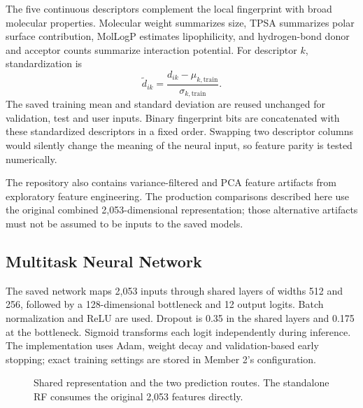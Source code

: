 \documentclass[11pt,a4paper]{article}\usepackage[margin=25mm]{geometry}\usepackage{fancyhdr}\usepackage{setspace}\usepackage{titlesec}\usepackage{xcolor}
\begin{document}
The five continuous descriptors complement the local fingerprint with broad molecular properties. Molecular weight summarizes size, TPSA summarizes polar surface contribution, MolLogP estimates lipophilicity, and hydrogen-bond donor and acceptor counts summarize interaction potential. For descriptor $k$, standardization is
\begin{equation}
\widetilde d_{ik}=\frac{d_{ik}-\mu_{k,\mathrm{train}}}{\sigma_{k,\mathrm{train}}}.
\end{equation}
The saved training mean and standard deviation are reused unchanged for validation, test and user inputs. Binary fingerprint bits are concatenated with these standardized descriptors in a fixed order. Swapping two descriptor columns would silently change the meaning of the neural input, so feature parity is tested numerically.

The repository also contains variance-filtered and PCA feature artifacts from exploratory feature engineering. The production comparisons described here use the original combined 2,053-dimensional representation; those alternative artifacts must not be assumed to be inputs to the saved models.


\subsection{Multitask Neural Network}
The saved network maps 2,053 inputs through shared layers of widths 512 and 256, followed by a 128-dimensional bottleneck and 12 output logits. Batch normalization and ReLU are used. Dropout is 0.35 in the shared layers and 0.175 at the bottleneck. Sigmoid transforms each logit independently during inference. The implementation uses Adam, weight decay and validation-based early stopping; exact training settings are stored in Member 2's configuration.

\begin{figure}[t]
\centering
{}
\caption{Shared representation and the two prediction routes. The standalone RF consumes the original 2,053 features directly.}
\label{fig:architecture}
\end{figure}
\end{document}
